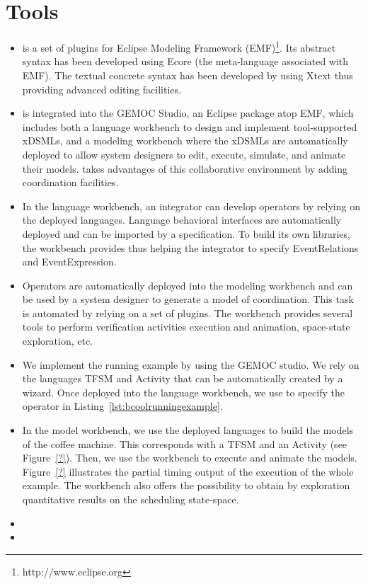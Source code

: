 \section{Tools}
\label{section:bcoollengbench}


\begin{itemize}
	\item \bcool is a set of plugins for Eclipse Modeling Framework (EMF)\footnote{http://www.eclipse.org}. Its abstract syntax has been developed using Ecore (\ie the meta-language associated with EMF). The textual concrete syntax has been developed by using Xtext thus providing advanced editing facilities.
	
	\item \bcool is integrated into the GEMOC Studio, an Eclipse package atop EMF, which includes both a language workbench to design and implement tool-supported xDSMLs, and a modeling workbench where the xDSMLs are automatically deployed to allow system designers to edit, execute, simulate, and animate their models. \bcool takes advantages of this collaborative environment by adding coordination facilities. 
	
	\item In the language workbench, an integrator can develop operators by relying on the deployed languages. Language behavioral interfaces are automatically deployed and can be imported by a \bcool specification. To build its own libraries, the workbench provides \moccml thus helping the integrator to specify EventRelations and EventExpression.   
	
	\item Operators are automatically deployed into the modeling workbench and can be used by a system designer to generate a model of coordination. This task is automated by relying on a set of plugins. The workbench provides several tools to perform verification activities \eg execution and animation, space-state exploration, etc.  

	\item We implement the running example by using the GEMOC studio. We rely on the languages TFSM and Activity that can be automatically created by a wizard. Once deployed into the language workbench, we use \bcool to specify the operator in Listing~\ref{lst:bcoolrunningexample}. 
	
	\item In the model workbench, we use the deployed languages to build the models of the coffee machine. This corresponds with a TFSM and an Activity (see Figure~\ref{?}). Then, we use the workbench to execute and animate the models. Figure~\ref{?} illustrates the partial timing output of the execution of the whole example. The workbench also offers the possibility to obtain by exploration quantitative results on the scheduling state-space.    
	
	\item {}

	\item {}
\end{itemize}
  

